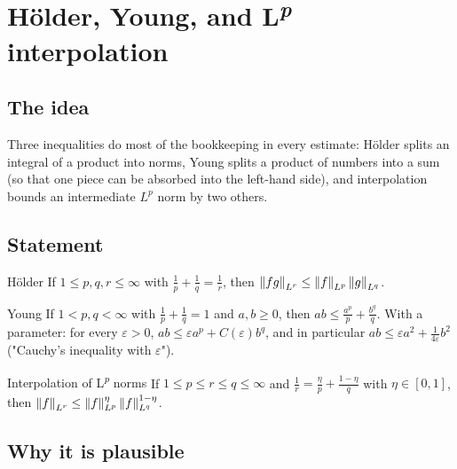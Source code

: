 
\section{Hölder, Young, and L\textsuperscript{\textit{p}} interpolation}\label{p:elementary-inequalities}

\subsection*{The idea}

Three inequalities do most of the bookkeeping in every estimate: Hölder splits an integral of a product into norms, Young splits a product of numbers into a sum (so that one piece can be absorbed into the left-hand side), and interpolation bounds an intermediate $L^p$ norm by two others.

\subsection*{Statement}

\begin{thmbox}{Hölder}
%
If $1 \le p, q, r \le \infty$ with $\frac1p + \frac1q = \frac1r$, then $\left\lVert fg\right\rVert_{L^r} \le \left\lVert f\right\rVert_{L^p}\left\lVert g\right\rVert_{L^q}$.
\end{thmbox}

\begin{thmbox}{Young}
%
If $1 < p, q < \infty$ with $\frac1p + \frac1q = 1$ and $a, b \ge 0$, then $ab \le \frac{a^p}{p} + \frac{b^q}{q}$. With a parameter: for every $\varepsilon > 0$, $ab \le \varepsilon a^p + C(\varepsilon) b^q$, and in particular $ab \le \varepsilon a^2 + \frac{1}{4\varepsilon} b^2$ ("Cauchy's inequality with $\varepsilon$").
\end{thmbox}

\begin{thmbox}{Interpolation of L\textsuperscript{\textit{p}} norms}
%
If $1 \le p \le r \le q \le \infty$ and $\frac1r = \frac{\eta}{p} + \frac{1-\eta}{q}$ with $\eta\in[0,1]$, then $\left\lVert f\right\rVert_{L^r} \le \left\lVert f\right\rVert_{L^p}^{\eta}\left\lVert f\right\rVert_{L^q}^{1-\eta}$.
\end{thmbox}

\subsection*{Why it is plausible}

